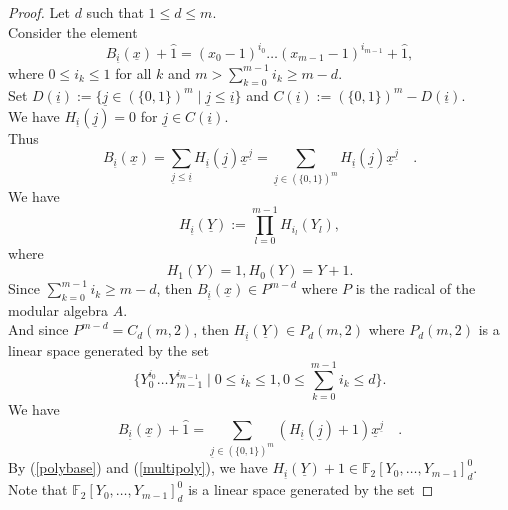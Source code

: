 \documentclass{article}
\theoremstyle{plain}
\theoremstyle{definition}
\begin{document}
\begin{proof}
Let $d$ such that $1\leq d\leq m$.\\
Consider the element
\begin{equation*}
B_{\underline{i}}(\underline{x})+\hat{1}=(x_{0}-1)^{i_0}\ldots (x_{m-1}-1)^{i_{m-1}}+\hat{1},
\end{equation*}
where $0\leq i_{k}\leq 1$ for all $k$ and $m>\sum_{k=0}^{m-1}i_{k}\geq m-d$.\\
Set $D(\underline{i}):=\{\underline{j}\in(\{0,1\})^{m}\mid \underline{j}\leq \underline{i}\}$ and $C(\underline{i}):=(\{0,1\})^{m}- D(\underline{i})$.\\
We have $H_{\underline{i}}(\underline{j})=0$ for $\underline{j}\in C(\underline{i})$.\\
Thus 
\begin{equation*}
B_{\underline{i}}(\underline{x})=\sum_{\underline{j}\leq \underline{i}}H_{\underline{i}}(\underline{j})\underline{x}^{\underline{j}}=\sum_{\underline{j}\in (\{0,1\})^m}H_{\underline{i}}(\underline{j})\underline{x}^{\underline{j}}\quad.
\end{equation*}
We have
\begin{equation*}
H_{\underline{i}}(\underline{Y}):=\prod_{l=0}^{m-1}H_{i_l}(Y_l),
\end{equation*}
where
\begin{equation}\label{polybase}
H_1(Y) = 1, H_0(Y) = Y+1.
\end{equation}
Since $\sum_{k=0}^{m-1}i_{k}\geq m-d$, then $B_{\underline{i}}(\underline{x})\in P^{m-d}$ where $P$ is the radical of the modular algebra $A$.\\
And since $P^{m-d}=C_{d}(m,2)$, then $H_{\underline{i}}(\underline{Y})\in P_{d}(m,2)$ where $P_{d}(m,2)$ is a linear space generated by the set
\begin{equation}\label{multipoly}
\{Y_0^{i_0}\ldots Y_{m-1}^{i_{m-1}}\mid 0\leq i_{k}\leq 1,0\leq \sum_{k=0}^{m-1}i_{k}\leq d\}.
\end{equation}
We have
\begin{equation*}
B_{\underline{i}}(\underline{x})+\hat{1}=\sum_{\underline{j}\in (\{0,1\})^m}(H_{\underline{i}}(\underline{j})+1)\underline{x}^{\underline{j}}\quad.
\end{equation*}
By (\ref{polybase}) and (\ref{multipoly}), we have $H_{\underline{i}}(\underline{Y})+1\in \mathbb{F}_{2}[Y_{0},\ldots,Y_{m-1}]_{d}^{0}$.\\
Note that $\mathbb{F}_{2}[Y_{0},\ldots,Y_{m-1}]_{d}^{0}$ is a linear space generated by the set

\end{proof}
\end{document}
